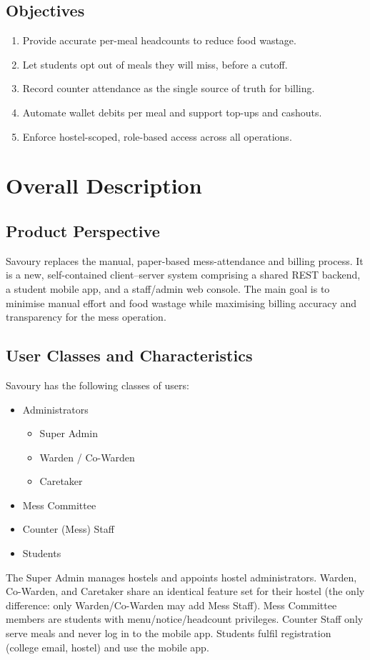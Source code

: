 \documentclass{scrreprt}
\begin{document}
\section{Objectives}
\begin{enumerate}
  \item Provide accurate per-meal headcounts to reduce food wastage.
  \item Let students opt out of meals they will miss, before a cutoff.
  \item Record counter attendance as the single source of truth for billing.
  \item Automate wallet debits per meal and support top-ups and cashouts.
  \item Enforce hostel-scoped, role-based access across all operations.
\end{enumerate}

\chapter{Overall Description}

\section{Product Perspective}
Savoury replaces the manual, paper-based mess-attendance and billing
process. It is a new, self-contained client--server system comprising a
shared REST backend, a student mobile app, and a staff/admin web console.
The main goal is to minimise manual effort and food wastage while
maximising billing accuracy and transparency for the mess operation.

\section{User Classes and Characteristics}
Savoury has the following classes of users:
\begin{itemize}
  \item Administrators
    \begin{itemize}
        \item Super Admin
        \item Warden / Co-Warden
        \item Caretaker
    \end{itemize}
  \item Mess Committee
  \item Counter (Mess) Staff
  \item Students
\end{itemize}
The Super Admin manages hostels and appoints hostel administrators.
Warden, Co-Warden, and Caretaker share an identical feature set for their
hostel (the only difference: only Warden/Co-Warden may add Mess Staff).
Mess Committee members are students with menu/notice/headcount
privileges. Counter Staff only serve meals and never log in to the mobile
app. Students fulfil registration (college email, hostel) and use the
mobile app.
\end{document}
